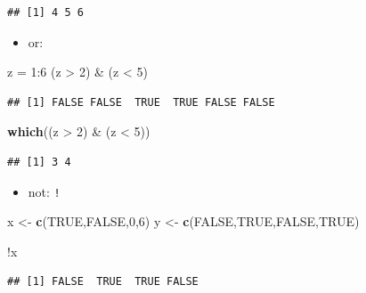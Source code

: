 \documentclass[]{article}
\def\tightlist{}
\newenvironment{Shaded}{\begin{snugshade}}{\end{snugshade}}
\newcommand{\KeywordTok}[1]{\textcolor[rgb]{0.13,0.29,0.53}{\textbf{{#1}}}}
\newcommand{\DecValTok}[1]{\textcolor[rgb]{0.00,0.00,0.81}{{#1}}}
\newcommand{\StringTok}[1]{\textcolor[rgb]{0.31,0.60,0.02}{{#1}}}
\newcommand{\OtherTok}[1]{\textcolor[rgb]{0.56,0.35,0.01}{{#1}}}
\newcommand{\NormalTok}[1]{{#1}}
\numberwithin{equation}{section}
\begin{document}
\begin{verbatim}
## [1] 4 5 6
\end{verbatim}

\begin{itemize}
\tightlist
\item
  or: \texttt{\textbar{}}
\end{itemize}

\begin{Shaded}
\begin{Highlighting}[]
\NormalTok{z =}\StringTok{ }\DecValTok{1}\NormalTok{:}\DecValTok{6}
\NormalTok{(z >}\StringTok{ }\DecValTok{2}\NormalTok{) &}\StringTok{ }\NormalTok{(z <}\StringTok{ }\DecValTok{5}\NormalTok{)}
\end{Highlighting}
\end{Shaded}

\begin{verbatim}
## [1] FALSE FALSE  TRUE  TRUE FALSE FALSE
\end{verbatim}

\begin{Shaded}
\begin{Highlighting}[]
\KeywordTok{which}\NormalTok{((z >}\StringTok{ }\DecValTok{2}\NormalTok{) &}\StringTok{ }\NormalTok{(z <}\StringTok{ }\DecValTok{5}\NormalTok{))}
\end{Highlighting}
\end{Shaded}

\begin{verbatim}
## [1] 3 4
\end{verbatim}

\begin{itemize}
\tightlist
\item
  not: \texttt{!}
\end{itemize}

\begin{Shaded}
\begin{Highlighting}[]
\NormalTok{x <-}\StringTok{ }\KeywordTok{c}\NormalTok{(}\OtherTok{TRUE}\NormalTok{,}\OtherTok{FALSE}\NormalTok{,}\DecValTok{0}\NormalTok{,}\DecValTok{6}\NormalTok{)}
\NormalTok{y <-}\StringTok{ }\KeywordTok{c}\NormalTok{(}\OtherTok{FALSE}\NormalTok{,}\OtherTok{TRUE}\NormalTok{,}\OtherTok{FALSE}\NormalTok{,}\OtherTok{TRUE}\NormalTok{)}

\NormalTok{!x}
\end{Highlighting}
\end{Shaded}

\begin{verbatim}
## [1] FALSE  TRUE  TRUE FALSE
\end{verbatim}
\end{document}
